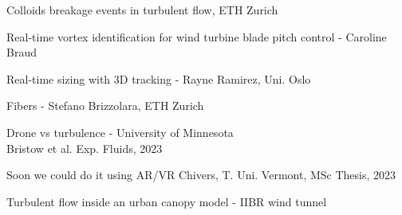     
\begin{frame}[label=app-3]{Colloids breakage events in turbulent flow, ETH Zurich}
    \end{frame}
    
    
\begin{frame}[label=app-5]{Real-time vortex identification for wind turbine blade pitch control - Caroline Braud}
    \begin{multicols*}{2}
    \end{multicols*}
\end{frame}
    
\begin{frame}[label=app-6]{Real-time sizing with 3D tracking - Rayne Ramirez, Uni. Oslo}
    \begin{multicols*}{2}
    \end{multicols*}
\end{frame}
    
\begin{frame}[label=app-7]{Fibers - Stefano Brizzolara, ETH Zurich}
\end{frame}
    
\begin{frame}[label=app-8]{Drone vs turbulence - University of Minnesota}
    \\
    Bristow et al. Exp. Fluids, 2023
\end{frame}
    
    \begin{frame}[label=app-9]{Soon we could do it using AR/VR}
    Chivers, T. Uni. Vermont, MSc Thesis, 2023
    \end{frame}
    
    
\begin{frame}[label=app-811]{Turbulent flow inside an urban canopy model - IIBR wind tunnel}
\end{frame}
%    

%